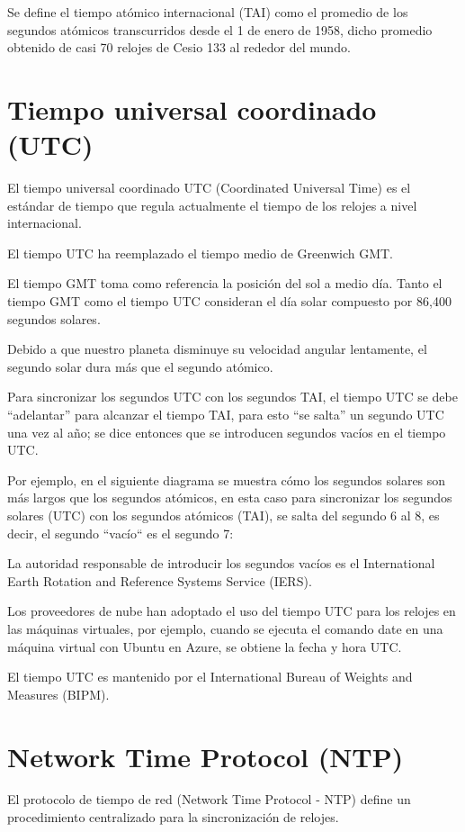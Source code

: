 \documentclass[11pt,a4paper,oneside]{book}
\begin{document}
Se define el tiempo atómico internacional (TAI) como el promedio de los segundos atómicos transcurridos desde el 1 de enero de 1958, dicho promedio obtenido de casi 70 relojes de Cesio 133 al rededor del mundo.

\section{Tiempo universal coordinado (UTC)}

El tiempo universal coordinado UTC (Coordinated Universal Time) es el estándar de tiempo que regula actualmente el tiempo de los relojes a nivel internacional.

El tiempo UTC ha reemplazado el tiempo medio de Greenwich GMT.

El tiempo GMT toma como referencia la posición del sol a medio día. Tanto el tiempo GMT como el tiempo UTC consideran el día solar compuesto por 86,400 segundos solares.

Debido a que nuestro planeta disminuye su velocidad angular lentamente, el segundo solar dura más que el segundo atómico.

Para sincronizar los segundos UTC con los segundos TAI, el tiempo UTC se debe “adelantar” para alcanzar el tiempo TAI, para esto “se salta” un segundo UTC una vez al año; se dice entonces que se introducen segundos vacíos en el tiempo UTC.

Por ejemplo, en el siguiente diagrama se muestra cómo los segundos solares son más largos que los segundos atómicos, en esta caso para sincronizar los segundos solares (UTC) con los segundos atómicos (TAI), se salta del segundo 6 al 8, es decir, el segundo ``vacío`` es el segundo 7:

La autoridad responsable de introducir los segundos vacíos es el International Earth Rotation and Reference Systems Service (IERS).

Los proveedores de nube han adoptado el uso del tiempo UTC para los relojes en las máquinas virtuales, por ejemplo, cuando se ejecuta el comando date en una máquina virtual con Ubuntu en Azure, se obtiene la fecha y hora UTC.

El tiempo UTC es mantenido por el International Bureau of Weights and Measures (BIPM).

\section{Network Time Protocol (NTP)}

El protocolo de tiempo de red (Network Time Protocol - NTP) define un procedimiento centralizado para la sincronización de relojes.
\end{document}

